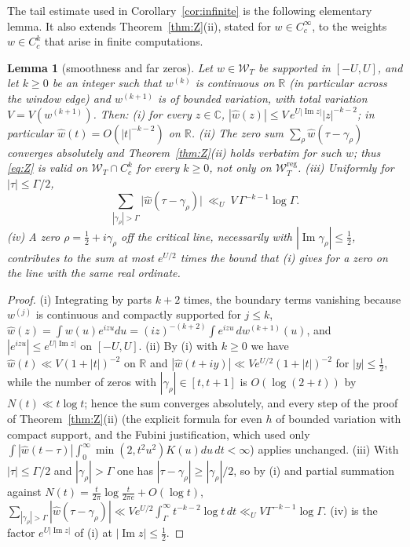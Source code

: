 \documentclass[11pt]{amsart}
\newtheorem{lemma}[theorem]{Lemma}
\theoremstyle{definition}
\theoremstyle{remark}
\newcommand{\C}{\mathbb C}
\newcommand{\R}{\mathbb R}
\newcommand{\Iml}{\operatorname{Im}}
\newcommand{\wh}{\widehat w}
\newcommand{\Wcl}{\mathcal W_T}
\begin{document}
The tail estimate used in Corollary~\ref{cor:infinite} is the following elementary lemma. It also
extends Theorem~\ref{thm:Z}(ii), stated for $w\in C_c^\infty$, to the weights $w\in C^k_c$ that
arise in finite computations.

\begin{lemma}[smoothness and far zeros]\label{lem:smooth}
Let $w\in\Wcl$ be supported in $[-U,U]$, and let $k\ge0$ be an integer such that $w^{(k)}$ is
continuous on $\R$ (in particular across the window edge) and $w^{(k+1)}$ is of bounded variation,
with total variation $V=V(w^{(k+1)})$. Then:
\emph{(i)} for every $z\in\C$, $|\wh(z)|\le V\,e^{U|\Iml z|}|z|^{-k-2}$; in particular
$\wh(t)=O(|t|^{-k-2})$ on $\R$.
\emph{(ii)} The zero sum $\sum_\rho\wh(\tau-\gamma_\rho)$ converges absolutely and
Theorem~\ref{thm:Z}(ii) holds verbatim for such $w$; thus \eqref{eq:Z} is valid on
$\Wcl\cap C_c^k$ for every $k\ge0$, not only on $\Wcl^{\mathrm{reg}}$.
\emph{(iii)} Uniformly for $|\tau|\le\Gamma/2$,
\[
\sum_{|\gamma_\rho|>\Gamma}\big|\wh(\tau-\gamma_\rho)\big|\ \ll_{U}\ V\,\Gamma^{-k-1}\log\Gamma .
\]
\emph{(iv)} A zero $\rho=\frac12+i\gamma_\rho$ off the critical line, necessarily with
$|\Iml\gamma_\rho|\le\frac12$, contributes to the sum at most $e^{U/2}$ times the bound that
\emph{(i)} gives for a zero on the line with the same real ordinate.
\end{lemma}
\begin{proof}
(i) Integrating by parts $k+2$ times, the boundary terms vanishing because $w^{(j)}$ is continuous
and compactly supported for $j\le k$,
$\wh(z)=\int w(u)e^{izu}du=(iz)^{-(k+2)}\int e^{izu}\,dw^{(k+1)}(u)$, and $|e^{izu}|\le e^{U|\Iml z|}$
on $[-U,U]$. (ii) By (i) with $k\ge0$ we have $\wh(t)\ll V(1+|t|)^{-2}$ on $\R$ and
$|\wh(t+iy)|\ll Ve^{U/2}(1+|t|)^{-2}$ for $|y|\le\frac12$, while the number of zeros with
$|\gamma_\rho|\in[t,t+1]$ is $O(\log(2+t))$ by $N(t)\ll t\log t$; hence the sum converges absolutely,
and every step of the proof of Theorem~\ref{thm:Z}(ii) (the explicit formula for even $h$ of bounded
variation with compact support, and the Fubini justification, which used only
$\int|\wh(t-\tau)|\int_0^\infty\min(2,t^2u^2)K(u)du\,dt<\infty$) applies unchanged.
(iii) With $|\tau|\le\Gamma/2$ and $|\gamma_\rho|>\Gamma$ one has $|\tau-\gamma_\rho|\ge|\gamma_\rho|/2$,
so by (i) and partial summation against $N(t)=\frac t{2\pi}\log\frac t{2\pi e}+O(\log t)$,
$\sum_{|\gamma_\rho|>\Gamma}|\wh(\tau-\gamma_\rho)|\ll Ve^{U/2}\int_\Gamma^\infty t^{-k-2}\log t\,dt
\ll_UV\Gamma^{-k-1}\log\Gamma$. (iv) is the factor $e^{U|\Iml z|}$ of (i) at $|\Iml z|\le\frac12$.
\end{proof}
\end{document}
